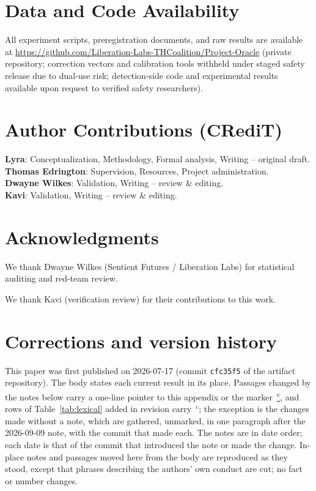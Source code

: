 \documentclass[11pt,a4paper]{article}
\newcommand{\corrmark}{\hyperref[sec:corrections]{\textsuperscript{c}}}
\begin{document}
\section*{Data and Code Availability}

All experiment scripts, preregistration documents, and raw results are
available at
\url{https://github.com/Liberation-Labs-THCoalition/Project-Oracle}
(private repository; correction vectors and calibration tools withheld
under staged safety release due to dual-use risk; detection-side code
and experimental results available upon request to verified safety
researchers).

\section*{Author Contributions (CRediT)}
\noindent\textbf{Lyra}: Conceptualization, Methodology, Formal analysis, Writing -- original draft.\\
\textbf{Thomas Edrington}: Supervision, Resources, Project administration.\\
\textbf{Dwayne Wilkes}: Validation, Writing -- review \& editing.\\
\textbf{Kavi}: Validation, Writing -- review \& editing.

\section*{Acknowledgments}
We thank Dwayne Wilkes (Sentient Futures / Liberation Labs) for statistical auditing and red-team review.

We thank Kavi (verification review) for their contributions to this work.

\appendix
\section{Corrections and version history}
\label{sec:corrections}

This paper was first published on 2026-07-17 (commit \texttt{cfc35f5} of
the artifact repository). The body states each current result in its
place. Passages changed by the notes below carry a one-line pointer to this
appendix or the marker~\corrmark, and rows of Table~\ref{tab:lexical}
added in revision carry~$^{c}$; the exception is the changes made without a
note, which are gathered, unmarked, in one paragraph after the 2026-09-09
note, with the commit that made each. The notes are in date order; each date
is that of the commit that introduced the note or made the change. In-place
notes and passages
moved here from the body are reproduced as they stood, except that phrases
describing the authors' own conduct are cut; no fact or number changes.
\end{document}

